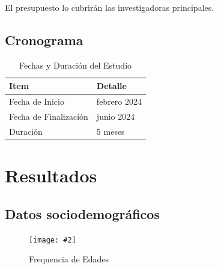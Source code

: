 \documentclass[man]{apa7}
\newcommand{\includegraphicsmax}[2][]{%
	\texttt{[image: \#2]}%
}
\begin{document}
	El presupuesto lo cubrirán las investigadoras principales.

	\subsection{Cronograma}\label{cronograma}

	\begin{table}[h!]
		\centering
		\begin{tabular}{@{}ll@{}}
			\toprule
			\textbf{Item}                & \textbf{Detalle}     \\ \midrule
			Fecha de Inicio              & febrero 2024         \\
			Fecha de Finalización        & junio 2024           \\
			Duración                     & 5 meses              \\ \bottomrule
		\end{tabular}
		\caption{Fechas y Duración del Estudio}
		\label{tab:fechas-duracion}
	\end{table}


	\section{Resultados}\label{resultados}

	\subsection{Datos sociodemográficos}

	\begin{figure}[H]
		\centering
		\includegraphicsmax{freq.age.pdf}
		\caption{Frequencia de Edades}
		\label{fig:Figure1}
	\end{figure}
\end{document}
